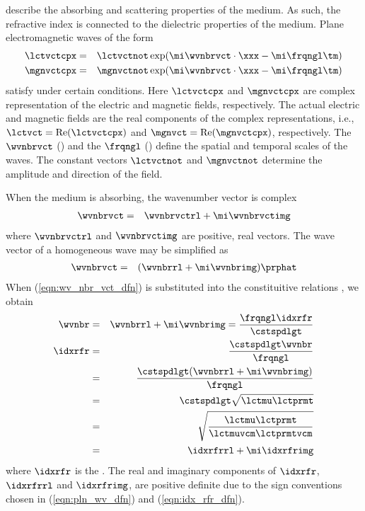 \documentclass[12pt,twoside]{book}
\begin{document}
 describe the absorbing and scattering
properties of the medium.
As such, the refractive index is connected to the dielectric
properties of the medium.
Plane electromagnetic waves of the form 
\begin{eqnarray}
\lctvctcpx & = & \lctvctnot \exp( \mi \wvnbrvct \cdot \xxx - \mi \frqngl \tm )
\nonumber \\
\mgnvctcpx & = & \mgnvctnot \exp( \mi \wvnbrvct \cdot \xxx - \mi \frqngl \tm )
\label{eqn:pln_wv_dfn}
\end{eqnarray}
satisfy  under certain conditions.
Here $\lctvctcpx$ and $\mgnvctcpx$ are complex representation of the
electric and magnetic fields, respectively.
The actual electric and magnetic fields are the real components of the
complex representations, i.e., 
$\lctvct = \mbox{Re}(\lctvctcpx)$ and 
$\mgnvct = \mbox{Re}(\mgnvctcpx)$, respectively.
The  $\wvnbrvct$ (\xm) and the
 $\frqngl$ (\xs) define the spatial and
temporal scales of the waves.
The constant vectors $\lctvctnot$ and $\mgnvctnot$ determine the
amplitude and direction of the field.

When the medium is absorbing, the wavenumber vector is complex 
\begin{eqnarray}
\wvnbrvct & = & \wvnbrvctrl + \mi \wvnbrvctimg
\label{eqn:wv_nbr_vct_dfn}
\end{eqnarray}
where $\wvnbrvctrl$ and $\wvnbrvctimg$ are
positive, real vectors.
The wave vector of a homogeneous wave may be simplified as
\begin{eqnarray}
\wvnbrvct & = & (\wvnbrrl + \mi \wvnbrimg) \prphat
\label{eqn:wv_nbr_scl_dfn}
\end{eqnarray}
When (\ref{eqn:wv_nbr_vct_dfn}) is substituted into the constituitive
relations \cite[e.g.,][]{BoH83}, we obtain
\begin{eqnarray}
\wvnbr & = & \wvnbrrl + \mi \wvnbrimg = 
\frac{\frqngl \idxrfr}{\cstspdlgt } \nonumber \\
\idxrfr & = & \frac{\cstspdlgt \wvnbr}{\frqngl } \nonumber \\
& = & \frac{\cstspdlgt ( \wvnbrrl + \mi \wvnbrimg )}{\frqngl } \nonumber \\
& = & \cstspdlgt \sqrt{ \lctmu \lctprmt } \nonumber \\
& = & \sqrt{ \frac{\lctmu \lctprmt}{\lctmuvcm \lctprmtvcm }} \nonumber \\
& = & \idxrfrrl + \mi \idxrfrimg
\label{eqn:idx_rfr_dfn}
\end{eqnarray}
where $\idxrfr$ is the .
The real and imaginary components of $\idxrfr$, $\idxrfrrl$ and
$\idxrfrimg$, are positive definite due to the sign conventions chosen 
in (\ref{eqn:pln_wv_dfn}) and (\ref{eqn:idx_rfr_dfn}).
\end{document}
